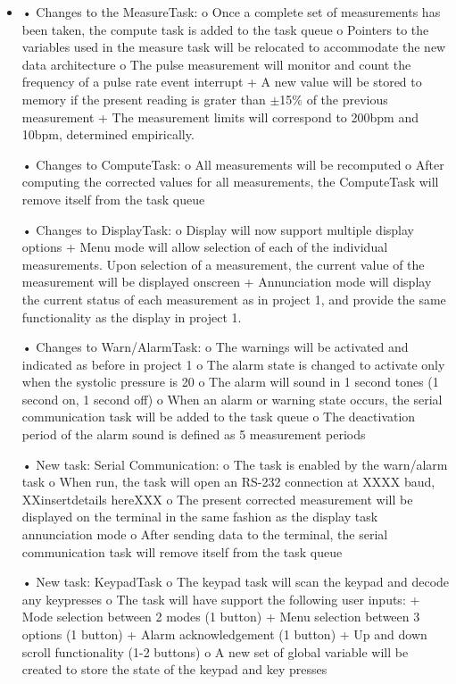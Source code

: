 \documentclass[12pt]{article} %
\begin{document}
\begin{itemize}
  \item
•	Changes to the MeasureTask:
o	Once a complete set of measurements has been taken, the compute task is added to the task queue
o	Pointers to the variables used in the measure task will be relocated to accommodate the new data architecture
o	The pulse measurement will monitor and count the frequency of a pulse rate event interrupt
+	A new value will be stored to memory if the present reading is grater than $\pm$15\% of the previous measurement
+	The measurement limits will correspond to 200bpm and 10bpm, determined empirically. 

•	Changes to ComputeTask:
o	All measurements will be recomputed
o	After computing the corrected values for all measurements, the ComputeTask will remove itself from the task queue

•	Changes to DisplayTask:
o	Display will now support multiple display options
+	Menu mode will allow selection of each of the individual measurements. Upon selection of a measurement, the current value of the measurement will be displayed onscreen
+	Annunciation mode will display the current status of each measurement as in project 1, and provide the same functionality as the display in project 1.

•	Changes to Warn/AlarmTask:
o	The warnings will be activated and indicated as before in project 1
o	The alarm state is changed to activate only when the systolic pressure is 20%
o	The alarm will sound in 1 second tones (1 second on, 1 second off)
o	When an alarm or warning state occurs, the serial communication task will be added to the task queue
o	The deactivation period of the alarm sound is defined as 5 measurement periods

•	New task: Serial Communication:
o	The task is enabled by the warn/alarm task
o	When run, the task will open an RS-232 connection at XXXX baud, XXinsertdetails hereXXX
o	The present corrected measurement will be displayed on the terminal in the same fashion as the display task annunciation mode
o	After sending data to the terminal, the serial communication task will remove itself from the task queue

•	New task: KeypadTask
o	The keypad task will scan the keypad and decode any keypresses
o	The task will have support the following user inputs:
+	Mode selection between 2 modes (1 button)
+	Menu selection between 3 options (1 button)
+	Alarm acknowledgement (1 button)
+	Up and down scroll functionality (1-2 buttons)
o	A new set of global variable will be created to store the state of the keypad and key presses


\end{itemize}
\end{document}
